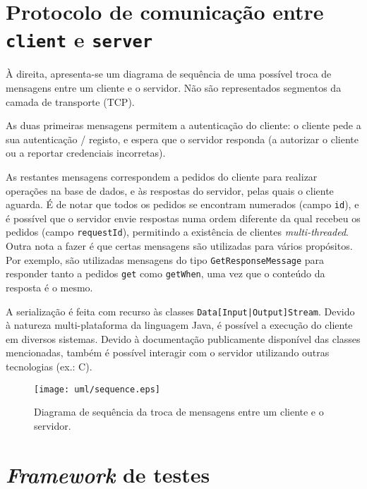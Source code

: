 \documentclass[11pt, a4paper]{article}
\begin{document}
\section{Protocolo de comunicação entre \texttt{client} e \texttt{server}}

\begin{minipage}{0.5\textwidth}
    \setlength{\parskip}{\baselineskip}
    \setlength{\parindent}{0pt}

    À direita, apresenta-se um diagrama de sequência de uma possível troca de mensagens entre um
    cliente e o servidor. Não são representados segmentos da camada de transporte (TCP).

    As duas primeiras mensagens permitem a autenticação do cliente: o cliente pede a sua
    autenticação / registo, e espera que o servidor responda (a autorizar o cliente ou a reportar
    credenciais incorretas).

    As restantes mensagens correspondem a pedidos do cliente para realizar operações na base de
    dados, e às respostas do servidor, pelas quais o cliente aguarda. É de notar que todos os
    pedidos se encontram numerados (campo \texttt{id}), e é possível que o servidor envie respostas
    numa ordem diferente da qual recebeu os pedidos (campo \texttt{requestId}), permitindo a
    existência de clientes \emph{multi-threaded}. Outra nota a fazer é que certas mensagens são
    utilizadas para vários propósitos. Por exemplo, são utilizadas mensagens do tipo
    \texttt{GetResponseMessage} para responder tanto a pedidos \texttt{get} como \texttt{getWhen},
    uma vez que o conteúdo da resposta é o mesmo.

    A serialização é feita com recurso às classes \texttt{Data[Input|Output]Stream}. Devido à
    natureza multi-plataforma da linguagem Java, é possível a execução do cliente em diversos sistemas.
    Devido à documentação publicamente disponível das classes mencionadas, também é possível interagir
    com o servidor utilizando outras tecnologias (ex.: C).
\end{minipage}
\begin{minipage}{0.5\textwidth}
    \begin{figure}[H]
        \centering
        \texttt{[image: uml/sequence.eps]}
        \caption{Diagrama de sequência da troca de mensagens entre um cliente e o servidor.}
        \label{sequence}
    \end{figure}
\end{minipage}

\section{\emph{Framework} de testes}
\end{document}
